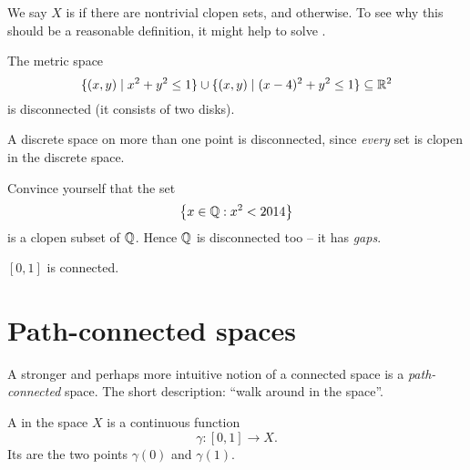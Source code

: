 We say $X$ is  if there are nontrivial clopen sets,
and  otherwise.
To see why this should be a reasonable definition, it might help
to solve .

\begin{example}
	\listhack
	\begin{enumerate}[(a)]
		\ii The metric space 
		\[ \{ (x,y) \mid x^2+y^2\le 1 \} \cup \{ (x,y) \mid (x-4)^2+y^2\le1\} \subseteq \mathbb R^2 \]
		is disconnected (it consists of two disks).

		\ii A discrete space on more than one point is disconnected,
		since \emph{every} set is clopen in the discrete space.

		\ii Convince yourself that the set 
		\[ \left\{ x \in \mathbb Q : x^2 < 2014 \right\} \]
		is a clopen subset of $\mathbb Q$. 
		Hence $\mathbb Q$ is disconnected too -- it has \emph{gaps}.

		\ii $[0,1]$ is connected.
	\end{enumerate}
\end{example}


\section{Path-connected spaces}
A stronger and perhaps more intuitive notion of a connected space is a \emph{path-connected} space.
The short description: ``walk around in the space''.


\begin{definition}
	A  in the space $X$ is a continuous function
	\[ \gamma : [0,1] \to X. \]
	Its  are the two points $\gamma(0)$ and $\gamma(1)$.
\end{definition}

